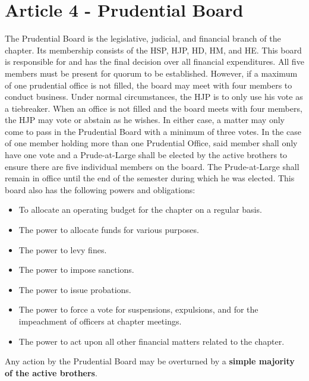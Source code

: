 \documentclass{article}
\begin{document}
\section*{Article 4 - Prudential Board}
\hspace*{1cm}The Prudential Board is the legislative, judicial, and financial branch of the chapter. Its membership consists of the HSP, HJP, HD, HM, and HE. This board is responsible for and has the final decision over all financial expenditures. All five members must be present for quorum to be established. However, if a maximum of one prudential office is not filled, the board may meet with four members to conduct business. Under normal circumstances, the HJP is to only use his vote as a tiebreaker. When an office is not filled and the board meets with four members, the HJP may vote or abstain as he wishes. In either case, a matter may only come to pass in the Prudential Board with a minimum of three votes. In the case of one member holding more than one Prudential Office, said member shall only have one vote and a Prude-at-Large shall be elected by the active brothers to ensure there are five individual members on the board. The Prude-at-Large shall remain in office until the end of the semester during which he was elected. This board also has the following powers and obligations:
\begin{itemize}
    \item To allocate an operating budget for the chapter on a regular basis.
    \item The power to allocate funds for various purposes.
    \item The power to levy fines.
    \item The power to impose sanctions.
    \item The power to issue probations.
    \item The power to force a vote for suspensions, expulsions, and for the impeachment of officers at chapter meetings.
    \item The power to act upon all other financial matters related to the chapter.
\end{itemize}
Any action by the Prudential Board may be overturned by a \textbf{simple majority of the active brothers}.
\end{document}
